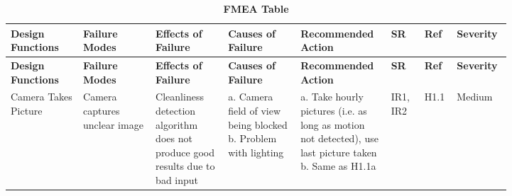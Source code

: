 \documentclass[12pt, titlepage]{article}
\begin{document}
\begin{longtable}{|>{\raggedright\arraybackslash}p{0.13\linewidth} | >{\raggedright\arraybackslash}p{0.13\linewidth} | >{\raggedright\arraybackslash}p{0.13\linewidth}| >{\raggedright\arraybackslash}p{0.13\linewidth}| >{\raggedright\arraybackslash}p{0.13\linewidth}| >{\raggedright\arraybackslash}p{0.06\linewidth}| >{\raggedright\arraybackslash}p{0.04\linewidth}| >{\raggedright\arraybackslash}p{0.07\linewidth}|}
    \caption{\bf FMEA Table} \label{tab:my_label} \\
    
    \hline
    \textbf{Design Functions} & \textbf{Failure Modes} & \textbf{Effects of Failure} & \textbf{Causes of Failure} & \textbf{Recommended Action} & \textbf{SR} & \textbf{Ref} & \textbf{Severity}\\
    \hline
    \endfirsthead
    
    \hline
    \textbf{Design Functions} & \textbf{Failure Modes} & \textbf{Effects of Failure} & \textbf{Causes of Failure} & \textbf{Recommended Action} & \textbf{SR} & \textbf{Ref} & \textbf{Severity}\\
    \hline
    \endhead
    
    \hline
    \endfoot
    
    \hline
    \endlastfoot


    \hline
    Camera Takes Picture & Camera captures unclear image \newline & Cleanliness detection algorithm does not produce good results due to bad input\newline & a. Camera field of view being blocked \newline b. Problem with lighting  \newline & a. Take hourly pictures (i.e. as long as motion not detected), use last picture taken \newline b. Same as H1.1a  \newline & IR1, \newline IR2 \newline & H1.1  \newline & Medium\\
    

\end{longtable}
\end{document}
